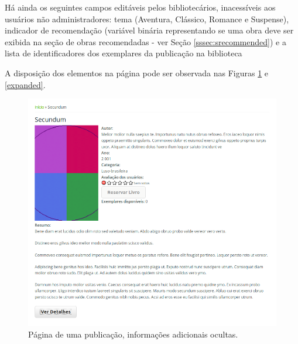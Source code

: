\documentclass[a4paper]{article}
\begin{document}
Há ainda os seguintes campos editáveis pelos bibliotecários, inacessíveis aos usuários não administradores: tema (Aventura, Clássico, Romance e Suspense), indicador de recomendação (variável binária representando se uma obra deve ser exibida na seção de obras recomendadas - ver Seção \ref{sssec:srecommended}) e a lista de identificadores dos exemplares da publicação na biblioteca

A disposição dos elementos na página pode ser observada nas Figuras \ref{colapsed} e \ref{expanded}.

\begin{figure}[pbth!]
\centering
\includegraphics[width=140mm]{img/publication-colapsed.png}
\caption{Página de uma publicação, informações adicionais ocultas.\label{colapsed}}
\end{figure}
\end{document}
